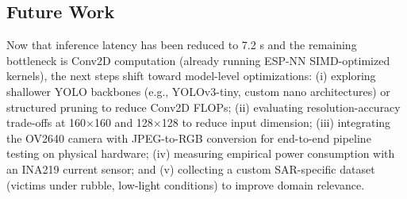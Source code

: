 \documentclass[10pt,twocolumn]{article}
\begin{document}
\subsection{Future Work}
Now that inference latency has been reduced to 7.2 s and the remaining bottleneck is Conv2D computation (already running ESP-NN SIMD-optimized kernels), the next steps shift toward model-level optimizations: (i) exploring shallower YOLO backbones (e.g., YOLOv3-tiny, custom nano architectures) or structured pruning to reduce Conv2D FLOPs; (ii) evaluating resolution-accuracy trade-offs at 160$\times$160 and 128$\times$128 to reduce input dimension; (iii) integrating the OV2640 camera with JPEG-to-RGB conversion for end-to-end pipeline testing on physical hardware; (iv) measuring empirical power consumption with an INA219 current sensor; and (v) collecting a custom SAR-specific dataset (victims under rubble, low-light conditions) to improve domain relevance.



\end{document}
